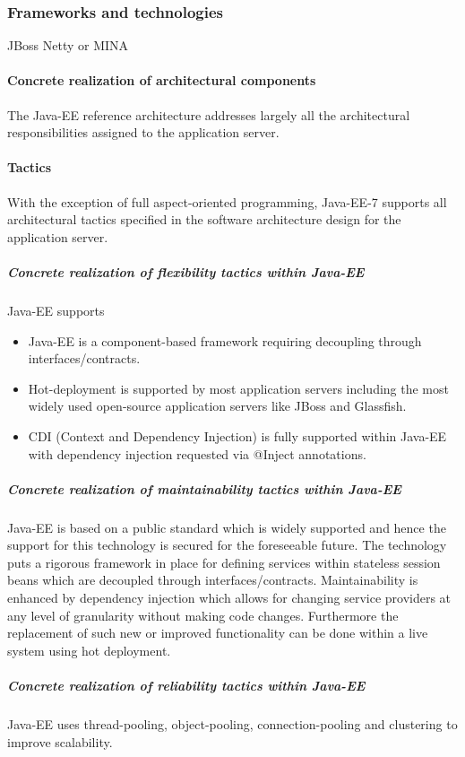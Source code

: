 \documentclass[a4paper,12pt]{report}
\begin{document}
\subsubsection {Frameworks and technologies}
JBoss
Netty or MINA


\paragraph {Concrete realization of architectural components}
\hfill \break
The Java-EE reference architecture addresses largely all the architectural responsibilities assigned to the application server.

\paragraph {Tactics}
\hfill \break
With the exception of full aspect-oriented programming, Java-EE-7 supports all architectural tactics specified in the software architecture design for the application server.

\subparagraph {Concrete realization of flexibility tactics  within Java-EE}
\hfill \break
Java-EE supports
	\begin {itemize}
		\item Java-EE is a component-based framework requiring decoupling through interfaces/contracts.
		\item Hot-deployment is supported by most application servers including the most widely used
open-source application servers like JBoss and Glassfish.
		\item CDI (Context and Dependency Injection) is fully supported within Java-EE with dependency
injection requested via @Inject annotations.
	\end {itemize}

\subparagraph {Concrete realization of maintainability tactics  within Java-EE}
Java-EE is based on a public standard which is widely supported and hence the support for this technology is secured for the foreseeable future. The technology puts a rigorous framework in place for defining services within stateless session beans which are decoupled through interfaces/contracts. Maintainability is enhanced by dependency injection which allows for changing service providers at any level of granularity without making code changes. Furthermore the replacement of such new
or improved functionality can be done within a live system using hot deployment.

\subparagraph {Concrete realization of reliability tactics  within Java-EE}
\hfill \break
Java-EE uses thread-pooling, object-pooling, connection-pooling and clustering to improve scalability.
\end{document}
